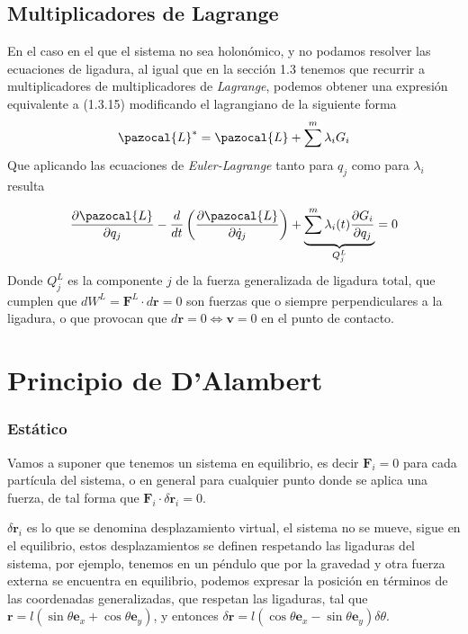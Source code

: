 \subsection{Multiplicadores de Lagrange}
En el caso en el que el sistema no sea holonómico, y no podamos resolver las ecuaciones de ligadura, al igual que en la sección 1.3 tenemos que recurrir a multiplicadores de multiplicadores de \textit{Lagrange}, podemos obtener una expresión equivalente a (1.3.15) modificando el lagrangiano de la siguiente forma
\begin{equation} \label{2.3.4}
    \pazocal{L}^* = \pazocal{L}+\sum^m{\lambda_i G_i}
\end{equation} 
Que aplicando las ecuaciones de \textit{Euler-Lagrange} tanto para $q_j$ como para $\lambda_i$ resulta

\vspace{-10pt}
\Large\begin{equation} \label{2.3.5}
    \frac{\partial \pazocal{L}}{\partial q_j} -\frac{d}{dt}\left(\frac{\partial \pazocal{L}}{\partial \dot{q}_j}\right) +\underbrace{\sum^m\lambda_i(t)\frac{\partial G_i}{\partial q_j}}_{Q^L_j}=0
\end{equation} \normalsize
Donde $Q^L_j$ es la componente $j$ de la fuerza generalizada de ligadura total, que cumplen que $dW^L = \mathbf{F}^L\cdot d\mathbf{r}=0$ son fuerzas que o siempre perpendiculares a la ligadura, o que provocan que $d\mathbf{r}=0 \iff \mathbf{v}=0$ en el punto de contacto.

\section{Principio de D'Alambert}
\subsubsection{Estático}
Vamos a suponer que tenemos un sistema en equilibrio, es decir $\mathbf{F}_i = 0$ para cada partícula del sistema, o en general para cualquier punto donde se aplica una fuerza, de tal forma que $\mathbf{F}_i \cdot \delta \mathbf{r}_i = 0$.

$\delta \mathbf{r}_i$ es lo que se denomina desplazamiento virtual, el sistema no se mueve, sigue en el equilibrio, estos desplazamientos se definen respetando las ligaduras del sistema, por ejemplo, tenemos en un péndulo que por la gravedad y otra fuerza externa se encuentra en equilibrio, podemos expresar la posición en términos de las coordenadas generalizadas, que respetan las ligaduras, tal que $\mathbf{r} = l (\sin \theta \mathbf{e}_x + \cos \theta \mathbf{e}_y)$, y entonces $\delta \mathbf{r} = l (\cos \theta \mathbf{e}_x-\sin\theta \mathbf{e}_y) \delta \theta$.

